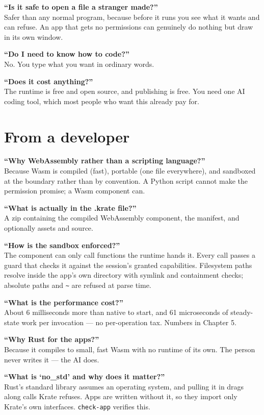 \documentclass[11pt,a4paper]{report}
\begin{document}
\textbf{``Is it safe to open a file a stranger made?''}\\
Safer than any normal program, because before it runs you see what it
wants and can refuse. An app that gets no permissions can genuinely do
nothing but draw in its own window.

\textbf{``Do I need to know how to code?''}\\
No. You type what you want in ordinary words.

\textbf{``Does it cost anything?''}\\
The runtime is free and open source, and publishing is free. You need one
AI coding tool, which most people who want this already pay for.

\section{From a developer}

\textbf{``Why WebAssembly rather than a scripting language?''}\\
Because Wasm is compiled (fast), portable (one file everywhere), and
sandboxed at the boundary rather than by convention. A Python script
cannot make the permission promise; a Wasm component can.

\textbf{``What is actually in the .krate file?''}\\
A zip containing the compiled WebAssembly component, the manifest, and
optionally assets and source.

\textbf{``How is the sandbox enforced?''}\\
The component can only call functions the runtime hands it. Every call
passes a guard that checks it against the session's granted capabilities.
Filesystem paths resolve inside the app's own directory with symlink and
containment checks; absolute paths and \texttt{\textasciitilde} are
refused at parse time.

\textbf{``What is the performance cost?''}\\
About 6 milliseconds more than native to start, and 61 microseconds of
steady-state work per invocation --- no per-operation tax. Numbers in
Chapter 5.

\textbf{``Why Rust for the apps?''}\\
Because it compiles to small, fast Wasm with no runtime of its own. The
person never writes it --- the AI does.

\textbf{``What is `no\_std' and why does it matter?''}\\
Rust's standard library assumes an operating system, and pulling it in
drags along calls Krate refuses. Apps are written without it, so they
import only Krate's own interfaces. \texttt{check-app} verifies this.
\end{document}
